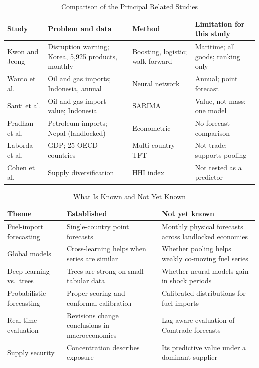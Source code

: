 \documentclass[conference]{IEEEtran}
\begin{document}
\begin{table}[t]
\caption{Comparison of the Principal Related Studies}
\label{tab:studies}
\centering
\footnotesize
\begin{tabularx}{\textwidth}{@{}L{2.9cm}XL{3.6cm}X@{}}
\toprule
Study & Problem and data & Method & Limitation for this study \\
\midrule
Kwon and Jeong \cite{kwon2026} & Disruption warning; Korea, 5,925 products, monthly & Boosting, logistic; walk-forward & Maritime; all goods; ranking only \\
Wanto et al. \cite{wanto2019} & Oil and gas imports; Indonesia, annual & Neural network & Annual; point forecast \\
Santi et al. \cite{santi2023} & Oil and gas import value; Indonesia & SARIMA & Value, not mass; one model \\
Pradhan et al. \cite{pradhan2023} & Petroleum imports; Nepal (landlocked) & Econometric & No forecast comparison \\
Laborda et al. \cite{laborda2023} & GDP; 25 OECD countries & Multi-country TFT & Not trade; supports pooling \\
Cohen et al. \cite{cohen2011} & Supply diversification & HHI index & Not tested as a predictor \\
\bottomrule
\end{tabularx}
\end{table}

\begin{table}[t]
\caption{What Is Known and Not Yet Known}
\label{tab:known}
\centering
\footnotesize
\begin{tabularx}{\columnwidth}{@{}L{1.7cm}XX@{}}
\toprule
Theme & Established & Not yet known \\
\midrule
Fuel-import forecasting & Single-country point forecasts & Monthly physical forecasts across landlocked economies \\
Global models & Cross-learning helps when series are similar & Whether pooling helps weakly co-moving fuel series \\
Deep learning vs.\ trees & Trees are strong on small tabular data & Whether neural models gain in shock periods \\
Probabilistic forecasting & Proper scoring and conformal calibration & Calibrated distributions for fuel imports \\
Real-time evaluation & Revisions change conclusions in macroeconomics & Lag-aware evaluation of Comtrade forecasts \\
Supply security & Concentration describes exposure & Its predictive value under a dominant supplier \\
\bottomrule
\end{tabularx}
\end{table}
\end{document}
